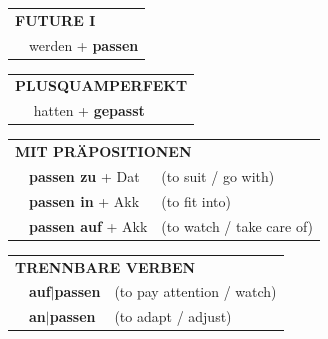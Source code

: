 \documentclass[10pt,a4paper]{revtex4-2}
\begin{document}
\begin{verbbox-dat}
\begin{tabular}{rl}
    \multicolumn{2}{l}{\textbf{FUTURE I} }\\
   & werden + \textbf{passen}\\
 
  \end{tabular}
\hfill
   \begin{tabular}{rl}
      \multicolumn{2}{l}{\textbf{PLUSQUAMPERFEKT}}\\
   & hatten + \textbf{gepasst}\\
  \end{tabular}

   \vspace{10pt}

   \begin{tabular}{lll}
      \multicolumn{3}{l}{\textbf{MIT PRÄPOSITIONEN}}\\
& \textbf{passen zu} + Dat & (to suit / go with)\\
& \textbf{passen in} + Akk & (to fit into)\\
& \textbf{passen auf} + Akk & (to watch / take care of)
\end{tabular}
  \hfill
   \begin{tabular}{lll}
      \multicolumn{3}{l}{\textbf{TRENNBARE VERBEN}}\\
 & \textbf{auf$|$passen} & (to pay attention / watch)\\
 & \textbf{an$|$passen} & (to adapt / adjust)\\
  \end{tabular}


  \vspace{-5pt}


\end{verbbox-dat}
\end{document}
